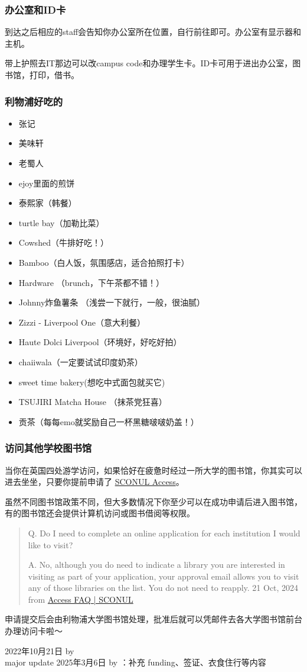 \subsubsection{办公室和ID卡}
到达之后相应的staff会告知你办公室所在位置，自行前往即可。办公室有显示器和主机。

带上护照去IT那边可以改campus code和办理学生卡。ID卡可用于进出办公室，图书馆，打印，借书。

\subsubsection{利物浦好吃的}
\begin{itemize}
    \item 张记
    \item 美味轩
    \item 老蜀人
    \item ejoy里面的煎饼
    \item 泰熙家（韩餐）
    \item turtle bay（加勒比菜）
    \item Cowshed（牛排好吃！）
    \item Bamboo（白人饭，氛围感店，适合拍照打卡）
    \item Hardware （brunch，下午茶都不错！）
    \item Johnny炸鱼薯条 （浅尝一下就行，一般，很油腻）
    \item Zizzi - Liverpool One（意大利餐）
    \item Haute Dolci Liverpool（环境好，好吃好拍）
    \item chaiiwala（一定要试试印度奶茶）
    \item sweet time bakery(想吃中式面包就买它)
    \item TSUJIRI Matcha House （抹茶党狂喜）
    \item 贡茶（每每emo就奖励自己一杯黑糖啵啵奶盖！）
\end{itemize}


\subsubsection{访问其他学校图书馆}
当你在英国四处游学访问，如果恰好在疲惫时经过一所大学的图书馆，你其实可以进去坐坐，只要你提前申请了 \href{https://access.sconul.ac.uk/sconul-access}{SCONUL Access}。

虽然不同图书馆政策不同，但大多数情况下你至少可以在成功申请后进入图书馆，有的图书馆还会提供计算机访问或图书借阅等权限。

\begin{quote}
    Q. Do I need to complete an online application for each institution I would like to visit?
    
    A. No, although you do need to indicate a library you are interested in visiting as part of your application, your approval email allows you to visit any of those libraries on the list. You do not need to reapply. \hfill 21 Oct, 2024 from \href{https://access.sconul.ac.uk/page/access-faq#Multiple%20applications}{Access FAQ | SCONUL}
\end{quote}

申请提交后会由利物浦大学图书馆处理，批准后就可以凭邮件去各大学图书馆前台办理访问卡啦～

\begin{flushright}
    2022年10月21日 by \Shiyao \\
    major update 2025年3月6日 by \Yue：补充 funding、签证、衣食住行等内容
\end{flushright}